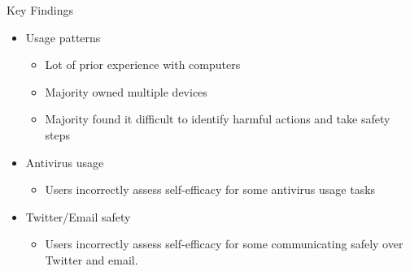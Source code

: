 \begin{frame}{Key Findings}
\begin{itemize}
\item Usage patterns
\begin{itemize}
\item Lot of prior experience with computers
\item Majority owned multiple devices
\item Majority found it difficult to identify harmful actions and take safety steps
\end{itemize}
\item Antivirus usage
\begin{itemize}
\item Users incorrectly assess self-efficacy for some antivirus usage tasks
\end{itemize}
\item Twitter/Email safety
\begin{itemize}
\item Users incorrectly assess self-efficacy for some communicating safely over Twitter and email.
\end{itemize}

\end{itemize}
\end{frame}